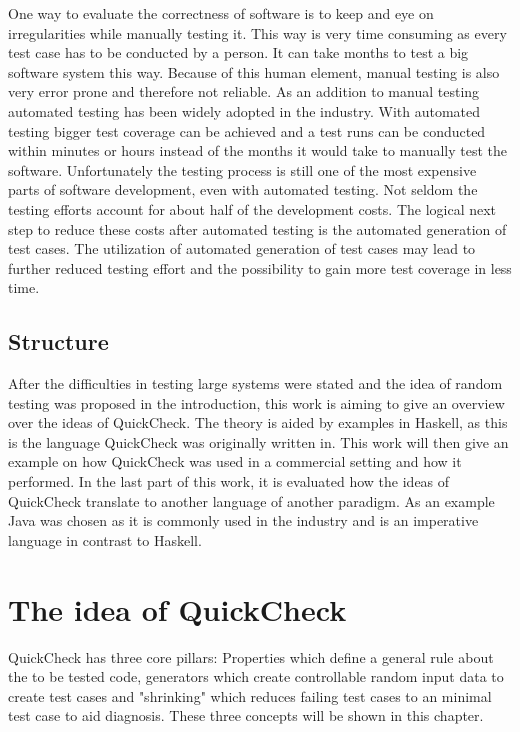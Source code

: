 \documentclass[a4paper, 12pt]{article} %
\begin{document}
One way to evaluate the correctness of software is to keep and eye on irregularities while manually testing it. This way is very time consuming as every test case has to be conducted by a person. It can take months to test a big software system this way. \cite{Arts06} Because of this human element, manual testing is also very error prone and therefore not reliable. As an addition to manual testing automated testing has been widely adopted in the industry. With automated testing bigger test coverage can be achieved and a test runs can be conducted within minutes or hours instead of the months it would take to manually test the software. Unfortunately the testing process is still one of the most expensive parts of software development, even with automated testing. Not seldom the testing efforts account for about half of the development costs. \cite{Claessen2000} The logical next step to reduce these costs after automated testing is the automated generation of test cases. The utilization of automated generation of test cases may lead to further reduced testing effort and the possibility to gain more test coverage in less time.

\subsection{Structure}

After the difficulties in testing large systems were stated and the idea of random testing was proposed in the introduction, this work is aiming to give an overview over the ideas of QuickCheck. The theory is aided by examples in Haskell, as this is the language QuickCheck was originally written in. This work will then give an example on how QuickCheck was used in a commercial setting and how it performed. In the last part of this work, it is evaluated how the ideas of QuickCheck translate to another language of another paradigm. As an example Java was chosen as it is commonly used in the industry and is an imperative language in contrast to Haskell.

\newpage
\section{The idea of QuickCheck}

QuickCheck has three core pillars: Properties which define a general rule about the to be tested code, generators which create controllable random input data to create test cases and "shrinking" which reduces failing test cases to an minimal test case to aid diagnosis. These three concepts will be shown in this chapter.
\end{document}
